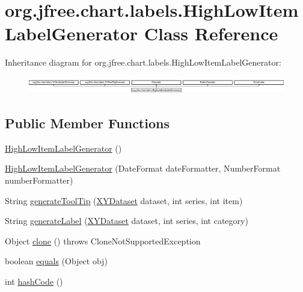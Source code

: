 \hypertarget{classorg_1_1jfree_1_1chart_1_1labels_1_1_high_low_item_label_generator}{}\section{org.\+jfree.\+chart.\+labels.\+High\+Low\+Item\+Label\+Generator Class Reference}
\label{classorg_1_1jfree_1_1chart_1_1labels_1_1_high_low_item_label_generator}
Inheritance diagram for org.\+jfree.\+chart.\+labels.\+High\+Low\+Item\+Label\+Generator\+:\begin{figure}[H]
\begin{center}
\leavevmode
\includegraphics[height=0.741722cm]{classorg_1_1jfree_1_1chart_1_1labels_1_1_high_low_item_label_generator}
\end{center}
\end{figure}
\subsection*{Public Member Functions}
\begin{DoxyCompactItemize}
\item 
\mbox{\hyperlink{classorg_1_1jfree_1_1chart_1_1labels_1_1_high_low_item_label_generator_a28783e569137288a2df208b489b83a36}{High\+Low\+Item\+Label\+Generator}} ()
\item 
\mbox{\hyperlink{classorg_1_1jfree_1_1chart_1_1labels_1_1_high_low_item_label_generator_a131d4d707d5c15354386ec3e00b2db22}{High\+Low\+Item\+Label\+Generator}} (Date\+Format date\+Formatter, Number\+Format number\+Formatter)
\item 
String \mbox{\hyperlink{classorg_1_1jfree_1_1chart_1_1labels_1_1_high_low_item_label_generator_a39496a1d1394657cc2c39ed5433d11f8}{generate\+Tool\+Tip}} (\mbox{\hyperlink{interfaceorg_1_1jfree_1_1data_1_1xy_1_1_x_y_dataset}{X\+Y\+Dataset}} dataset, int series, int item)
\item 
String \mbox{\hyperlink{classorg_1_1jfree_1_1chart_1_1labels_1_1_high_low_item_label_generator_a09770737c897174ae8ac3923086c19eb}{generate\+Label}} (\mbox{\hyperlink{interfaceorg_1_1jfree_1_1data_1_1xy_1_1_x_y_dataset}{X\+Y\+Dataset}} dataset, int series, int category)
\item 
Object \mbox{\hyperlink{classorg_1_1jfree_1_1chart_1_1labels_1_1_high_low_item_label_generator_ab18c4069d475adbf4f4b6c68983bc7c6}{clone}} ()  throws Clone\+Not\+Supported\+Exception 
\item 
boolean \mbox{\hyperlink{classorg_1_1jfree_1_1chart_1_1labels_1_1_high_low_item_label_generator_ab833568f5f95086670af5624ed4c4860}{equals}} (Object obj)
\item 
int \mbox{\hyperlink{classorg_1_1jfree_1_1chart_1_1labels_1_1_high_low_item_label_generator_a51f3cb9649e5c3ec14e9e4386a712b49}{hash\+Code}} ()
\end{DoxyCompactItemize}


